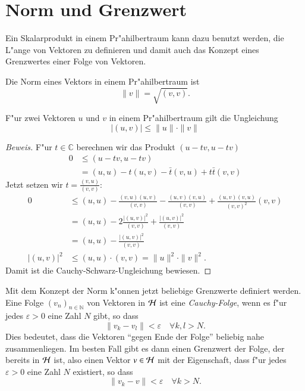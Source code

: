 \section{Norm und Grenzwert}
Ein Skalarprodukt in einem Pr"ahilbertraum kann dazu benutzt werden,
die L"ange von Vektoren zu definieren und damit auch das Konzept eines
Grenzwertes einer Folge von Vektoren.

\begin{definition}
Die Norm eines Vektors in einem Pr"ahilbertraum ist
\[
\| v\| = \sqrt{(v,v)}.
\]
\end{definition}

\begin{satz} F"ur zwei Vektoren $u$ und $v$
in einem Pr"ahilbertraum gilt die Ungleichung
\[
|(u,v)| \le \| u\|\cdot \| v\|
\]
\end{satz}

\begin{proof}[Beweis]
F"ur $t\in\mathbb C$ berechnen wir das Produkt $(u-tv, u-tv)$
\begin{align*}
0&\le (u-tv,u-tv)\\
 &=   (u,u) - t(u,v) - \bar t(v,u) +   t\bar t(v,v) 
\end{align*}
Jetzt setzen wir $t=\frac{(v,u)}{(v,v)}$:
\begin{align*}
0&\le (u,u) - \frac{(v,u)(u,v)}{(v,v)} - \frac{(u,v)(v,u)}{(v,v)} + \frac{(u,v)(v,u)}{(v,v)^2}(v,v)\\
 &=(u,u) - 2\frac{|(u,v)|^2}{(v,v)} +\frac{|(u,v)|^2}{(v,v)}\\
 &=(u,u) -\frac{|(u,v)|^2}{(v,v)}\\
|(u,v)|^2&\le (u,u)\cdot (v,v) = \|u\|^2\cdot \|v\|^2.
\end{align*}
Damit ist die Cauchy-Schwarz-Ungleichung bewiesen.
\end{proof}

Mit dem Konzept der Norm k"onnen jetzt beliebige Grenzwerte 
definiert werden.
Eine Folge $(v_n)_{n\in\mathbb N}$ von Vektoren in $\cal H$ ist eine
{\em Cauchy-Folge}, wenn es f"ur jedes $\varepsilon>0$ eine Zahl
$N$ gibt, so dass
\[
\|v_k-v_l\| <\varepsilon\quad\forall k,l>N.
\]
Dies bedeutet, dass die Vektoren ``gegen Ende der Folge'' beliebig
nahe zusammenliegen. 
Im besten Fall gibt es dann einen Grenzwert der Folge, der bereits in
$\cal H$ ist, also einen Vektor $v\in\cal H$ mit der Eigenschaft,
dass f"ur jedes $\varepsilon > 0$ eine Zahl $N$ existiert, so dass
\[
\|v_k-v\| < \varepsilon\quad\forall k>N.
\]

